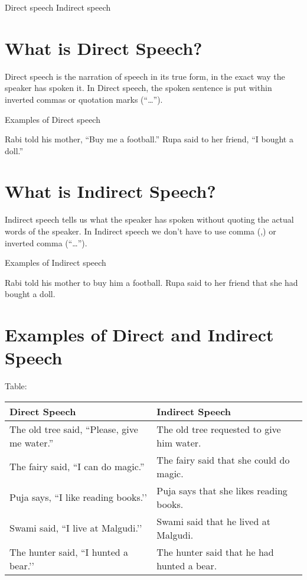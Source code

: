 \documentclass[a4paper,12pt]{book}
\begin{document}
Direct speech
Indirect speech 

\section{What is Direct Speech?}
\label{sec:org1c7d4d3}

Direct speech is the narration of speech in its true form, in the exact way the speaker has spoken it. In Direct speech, the spoken sentence is put within inverted commas or quotation marks (“…”). 

Examples of Direct speech 

Rabi told his mother, “Buy me a football.”                                
Rupa said to her friend, “I bought a doll.” 

\section{What is Indirect Speech?}
\label{sec:org77543e0}

Indirect speech tells us what the speaker has spoken without quoting the actual words of the speaker. In Indirect speech we don’t have to use comma (,) or inverted comma (“…”).  

Examples of Indirect speech 

Rabi told his mother to buy him a football.
Rupa said to her friend that she had bought a doll.

\section{Examples of Direct and Indirect Speech}
\label{sec:org78e4dfc}

Table:\\[0pt]

\begin{tabular}{|l|l|}
\hline  %
 \textbf{Direct Speech}                     & \textbf{Indirect Speech}                   \\ \hline
The old tree said, “Please, give me water.” & The old tree requested to give him water.  \\ \hline
The fairy said, “I can do magic.”           & The fairy said that she could do magic.    \\ \hline
Puja says, “I like reading books.’’         & Puja says that she likes reading books.    \\ \hline
Swami said, “I live at Malgudi.’’           & Swami said that he lived at Malgudi.       \\ \hline
The hunter said, “I hunted a bear.’’        & The hunter said that he had hunted a bear. \\ \hline
\end{tabular}
\end{document}
